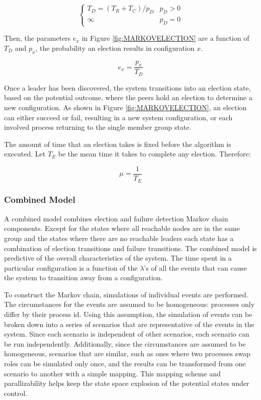 \begin{equation}
\begin{cases}
T_{D} = ( T_{R}+T_{C} ) / p_{D} & p_{D} > 0 \\
\infty & p_{D} = 0
\end{cases}
\end{equation}

Then, the parameters $e_x$ in Figure \ref{fig:MARKOVELECTION} are a function of $T_{D}$ and $p_{x}$, the probability an election results in configuration $x$.

\begin{equation}
e_x = \frac{p_{x}}{T_{D}}
\end{equation}

Once a leader has been discovered, the system transitions into an election state, based on the potential outcome, where the peers hold an election to determine a new configuration. As shown in Figure \ref{fig:MARKOVELECTION}, an election can either succeed or fail, resulting in a new system configuration, or each involved process returning to the single member group state.

The amount of time that an election takes is fixed before the algorithm is executed. Let $T_{E}$ be the mean time it takes to complete any election. Therefore:

\begin{equation}
\mu = \frac{1}{T_{E}}
\end{equation}

\subsubsection{Combined Model}

A combined model combines election and failure detection Markov chain components. Except for the states where all reachable nodes are in the same group and the states where there are no reachable leaders each state has a combination of election transitions and failure transitions. The combined model is predictive of the overall characteristics of the system. The time spent in a particular configuration is a function of the $\lambda$'s of all the events that can cause the system to transition away from a configuration.

To construct the Markov chain, simulations of individual events are performed. The circumstances for the events are assumed to be homogeneous: processes only differ by their process id. Using this assumption, the simulation of events can be broken down into a series of scenarios that are representative of the events in the system. Since each scenario is independent of other scenarios, each scenario can be run independently.  Additionally, since the circumstances are assumed to be homogeneous, scenarios that are similar, such as ones where two processes swap roles can be simulated only once, and the results can be transformed from one scenario to another with a simple mapping. This mapping scheme and parallizability helps keep the state space explosion of the potential states under control.

